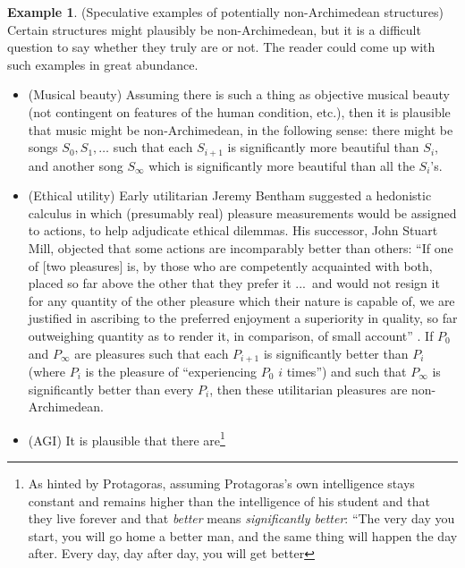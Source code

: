 \documentclass[reqno]{article}
\theoremstyle{definition}
\newtheorem{example}[theorem]{Example}
\begin{document}
\begin{example}
\label{speculativeexamples}
    (Speculative examples of potentially non-Archimedean structures)
    Certain structures might plausibly be non-Archimedean, but it is a difficult
    question to say whether they truly are or not. The reader could come up with
    such examples in great abundance.
    \begin{itemize}
        \item
        (Musical beauty)
        Assuming there is such a thing as objective
        musical beauty (not contingent on features of the human condition, etc.),
        then it is plausible that music might be non-Archimedean, in the following
        sense: there might be songs $S_0,S_1,\ldots$ such that each $S_{i+1}$
        is significantly more beautiful than $S_i$, and another song
        $S_\infty$ which is significantly more beautiful than all the $S_i$'s.
        \item
        (Ethical utility)
        Early utilitarian Jeremy Bentham suggested a hedonistic
        calculus in which (presumably real) pleasure measurements would be assigned to
        actions, to help adjudicate ethical dilemmas.
        His successor, John Stuart Mill, objected that some actions are incomparably
        better than others: ``If one of [two pleasures] is, by those
        who are competently acquainted with both, placed so far above the other that
        they prefer it ...\ and would not resign it for any quantity of the other
        pleasure which their nature is capable of, we are justified in ascribing to
        the preferred enjoyment a superiority in quality, so far outweighing quantity
        as to render it, in comparison, of small account'' \cite{mill}.
        If $P_0$ and $P_\infty$ are pleasures such that
        each $P_{i+1}$ is significantly better than $P_i$ (where $P_i$ is the
        pleasure of ``experiencing $P_0$ $i$ times'') and such that $P_\infty$
        is significantly better than every $P_i$,
        then these utilitarian pleasures are non-Archimedean.
        \item
        (AGI)
        It is plausible that there
        are\footnote{As hinted by Protagoras, assuming Protagoras's own intelligence
        stays constant and remains higher than the intelligence of his student
        and that they live forever and that \emph{better} means \emph{significantly
        better}:
        ``The very day you start, you will go home a better man, and the same thing
        will happen the day after. Every day, day after day, you will get better
}
\end{itemize}
\end{example}
\end{document}
